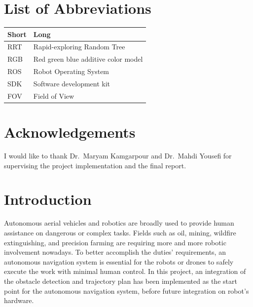 \documentclass[
  oneside]{ubcthesis}
\begin{document}
{
\setcounter{tocdepth}{2}
\tableofcontents
}
\hypertarget{list-of-abbreviations}{%
\chapter{List of Abbreviations}\label{list-of-abbreviations}}

\begin{longtable}{ll}
\toprule
Short & Long\\
\midrule
RRT & Rapid-exploring Random Tree\\
RGB & Red green blue additive color model\\
ROS & Robot Operating System\\
SDK & Software development kit\\
FOV & Field of View\\
\bottomrule
\end{longtable}

\hypertarget{acknowledgements}{%
\chapter{Acknowledgements}\label{acknowledgements}}

I would like to thank Dr.~Maryam Kamgarpour and Dr.~Mahdi Yousefi for supervising the project implementation and the final report.

\mainmatter

\hypertarget{introduction}{%
\chapter{Introduction}\label{introduction}}

Autonomous aerial vehicles and robotics are broadly used to provide human assistance on dangerous or complex tasks. Fields such as oil, mining, wildfire extinguishing, and precision farming are requiring more and more robotic involvement nowadays. To better accomplish the duties' requirements, an autonomous navigation system is essential for the robots or drones to safely execute the work with minimal human control. In this project, an integration of the obstacle detection and trajectory plan has been implemented as the start point for the autonomous navigation system, before future integration on robot's hardware.
\end{document}
